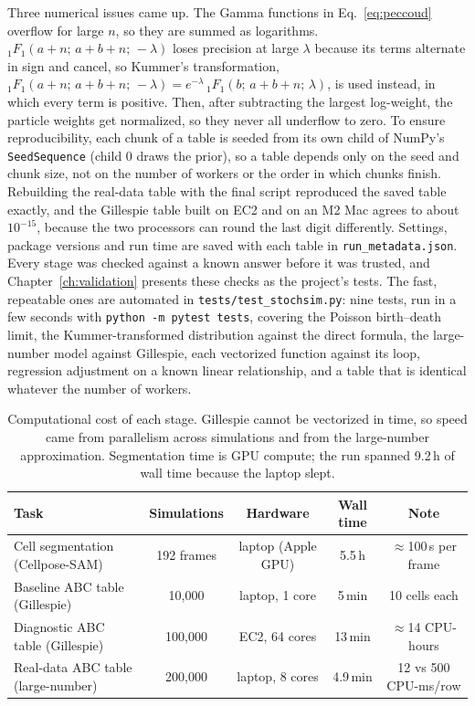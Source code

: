 Three numerical issues came up. The Gamma functions in Eq.~\eqref{eq:peccoud} overflow for large $n$, so they are summed as logarithms. ${}_1F_1(a+n;\,a+b+n;\,-\lambda)$ loses precision at large $\lambda$ because its terms alternate in sign and cancel, so Kummer's transformation, ${}_1F_1(a+n;\,a+b+n;\,-\lambda) = e^{-\lambda}\,{}_1F_1(b;\,a+b+n;\,\lambda)$, is used instead, in which every term is positive. Then, after subtracting the largest log-weight, the particle weights get normalized, so they never all underflow to zero. To ensure reproducibility, each chunk of a table is seeded from its own child of NumPy's \texttt{SeedSequence} (child 0 draws the prior), so a table depends only on the seed and chunk size, not on the number of workers or the order in which chunks finish. Rebuilding the real-data table with the final script reproduced the saved table exactly, and the Gillespie table built on EC2 and on an M2 Mac agrees to about $10^{-15}$, because the two processors can round the last digit differently. Settings, package versions and run time are saved with each table in \texttt{run\_metadata.json}. Every stage was checked against a known answer before it was trusted, and Chapter~\ref{ch:validation} presents these checks as the project's tests. The fast, repeatable ones are automated in \texttt{tests/test\_stochsim.py}: nine tests, run in a few seconds with \texttt{python -m pytest tests}, covering the Poisson birth--death limit, the Kummer-transformed distribution against the direct formula, the large-number model against Gillespie, each vectorized function against its loop, regression adjustment on a known linear relationship, and a table that is identical whatever the number of workers.

\begin{table}[htbp]
\centering
\small
\begin{tabular}{lcccc}
\toprule
Task & Simulations & Hardware & Wall time & Note \\
\midrule
Cell segmentation (Cellpose-SAM) & 192 frames & laptop (Apple GPU) & 5.5\,h & $\approx$100\,s per frame \\
Baseline ABC table (Gillespie) & 10,000 & laptop, 1 core & 5\,min & 10 cells each \\
Diagnostic ABC table (Gillespie) & 100,000 & EC2, 64 cores & 13\,min & $\approx$14 CPU-hours \\
Real-data ABC table (large-number) & 200,000 & laptop, 8 cores & 4.9\,min & 12 vs 500 CPU-ms/row \\
\bottomrule
\end{tabular}
\caption{Computational cost of each stage. Gillespie cannot be vectorized in time, so speed came from parallelism across simulations and from the large-number approximation. Segmentation time is GPU compute; the run spanned 9.2\,h of wall time because the laptop slept.}
\label{tab:runtime}
\end{table}
